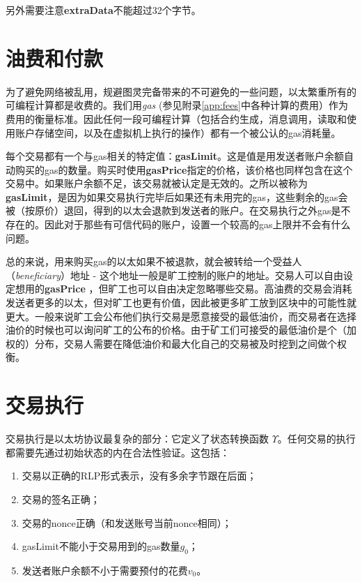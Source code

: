 \documentclass[UTF8,nofonts]{ctexart}
\begin{document}
\begin{multicols}{2}
另外需要注意\textbf{extraData}不能超过32个字节。

\section{油费和付款} \label{ch:payment}

为了避免网络被乱用，规避图灵完备带来的不可避免的一些问题，以太繁重所有的可编程计算都是收费的。我们用\textit{gas} (参见附录\ref{app:fees}中各种计算的费用）作为费用的衡量标准。因此任何一段可编程计算（包括合约生成，消息调用，读取和使用账户存储空间，以及在虚拟机上执行的操作）都有一个被公认的gas消耗量。

每个交易都有一个与gas相关的特定值：\textbf{gasLimit}。这是值是用发送者账户余额自动购买的gas的数量。购买时使用\textbf{gasPrice}指定的价格，该价格也同样包含在这个交易中。如果账户余额不足，该交易就被认定是无效的。之所以被称为\textbf{gasLimit}，是因为如果交易执行完毕后如果还有未用完的gas，这些剩余的gas会被（按原价）退回，得到的以太会退款到发送者的账户。在交易执行之外gas是不存在的。因此对于那些有可信代码的账户，设置一个较高的gas上限并不会有什么问题。

总的来说，用来购买gas的以太如果不被退款，就会被转给一个受益人（\textit{beneficiary}）地址 - 这个地址一般是旷工控制的账户的地址。交易人可以自由设定想用的\textbf{gasPrice} ，但旷工也可以自由决定忽略哪些交易。高油费的交易会消耗发送者更多的以太，但对旷工也更有价值，因此被更多旷工放到区块中的可能性就更大。一般来说旷工会公布他们执行交易是愿意接受的最低油价，而交易者在选择油价的时候也可以询问旷工的公布的价格。由于矿工们可接受的最低油价是个（加权的）分布，交易人需要在降低油价和最大化自己的交易被及时挖到之间做个权衡。



\section{交易执行} \label{ch:transactions}

交易执行是以太坊协议最复杂的部分：它定义了状态转换函数 $\Upsilon$。任何交易的执行都需要先通过初始状态的内在合法性验证。这包括：

\begin{enumerate}
\item 交易以正确的RLP形式表示，没有多余字节跟在后面；
\item 交易的签名正确；
\item 交易的nonce正确（和发送账号当前nonce相同）；
\item gasLimit不能小于交易用到的gas数量$g_0$；
\item 发送者账户余额不小于需要预付的花费$v_0$。
\end{enumerate}


\end{multicols}
\end{document}

